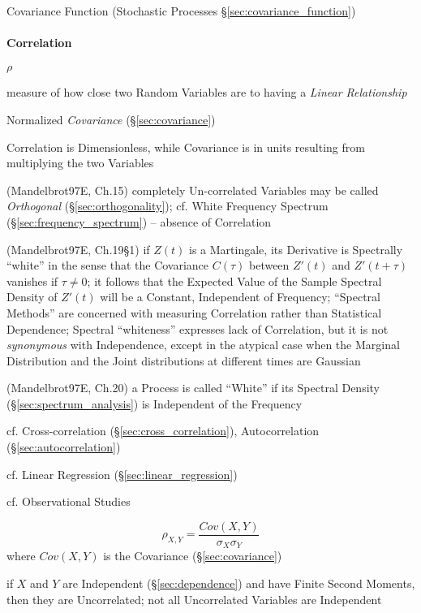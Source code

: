 \fist Covariance Function (Stochastic Processes \S\ref{sec:covariance_function})



\paragraph{Correlation}\label{sec:statistical_correlation}\hfill

$\rho$

measure of how close two Random Variables are to having a \emph{Linear
  Relationship}

Normalized \emph{Covariance} (\S\ref{sec:covariance})

Correlation is Dimensionless, while Covariance is in units resulting from
multiplying the two Variables

(Mandelbrot97E, Ch.15) completely Un-correlated Variables may be called
\emph{Orthogonal} (\S\ref{sec:orthogonality}); cf. White Frequency Spectrum
(\S\ref{sec:frequency_spectrum}) -- absence of Correlation

(Mandelbrot97E, Ch.19\S 1) if $Z(t)$ is a Martingale, its Derivative is
Spectrally ``white'' in the sense that the Covariance $C(\tau)$ between $Z'(t)$
and $Z'(t + \tau)$ vanishes if $\tau \neq 0$; it follows that the Expected Value
of the Sample Spectral Density of $Z'(t)$ will be a Constant, Independent of
Frequency; ``Spectral Methods'' are concerned with measuring Correlation rather
than Statistical Dependence; Spectral ``whiteness'' expresses lack of
Correlation, but it is not \emph{synonymous} with Independence, except in the
atypical case when the Marginal Distribution and the Joint distributions at
different times are Gaussian

(Mandelbrot97E, Ch.20) a Process is called ``White'' if its Spectral Density
(\S\ref{sec:spectrum_analysis}) is Independent of the Frequency

\fist cf. Cross-correlation (\S\ref{sec:cross_correlation}), Autocorrelation
(\S\ref{sec:autocorrelation})

\fist cf. Linear Regression (\S\ref{sec:linear_regression})

cf. Observational Studies

\[
  \rho_{X,Y} = \frac{Cov(X,Y)}{\sigma_X \sigma_Y}
\]
where $Cov(X,Y)$ is the Covariance (\S\ref{sec:covariance})

if $X$ and $Y$ are Independent (\S\ref{sec:dependence}) and have Finite Second
Moments, then they are Uncorrelated; not all Uncorrelated Variables are
Independent

